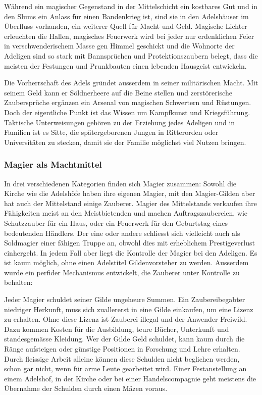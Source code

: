 \documentclass[12pt,twoside,twocolumn,openany]{book}
\begin{document}
Während ein magischer Gegenstand in der Mittelschicht ein kostbares Gut und in den Slums ein Anlass für einen Bandenkrieg ist, sind sie in den Adelshäuser im Überfluss vorhanden, ein weiterer Quell für Macht und Geld.
Magische Lichter erleuchten die Hallen, magisches Feuerwerk wird bei jeder nur erdenklichen Feier in verschwenderischem Masse gen Himmel geschickt und die Wohnorte der Adeligen sind so stark mit Bannsprüchen und Protektionszaubern belegt, dass die meisten der Festungen und Prunkbauten einen lebenden Hausgeist entwickeln.

Die Vorherrschaft des Adels gründet ausserdem in seiner militärischen Macht. Mit seinem Geld kann er Söldnerheere auf die Beine stellen und zerstörerische Zaubersprüche ergänzen ein Arsenal von magischen Schwertern und Rüstungen. Doch der eigentliche Punkt ist das Wissen um Kampfkunst und Kriegsführung. Taktische Unterweisungen gehören zu der Erziehung jedes Adeligen und in Familien ist es Sitte, die spätergeborenen Jungen in Ritterorden oder Universitäten zu stecken, damit sie der Familie möglichst viel Nutzen bringen.

\subsubsection{Magier als Machtmittel}
In drei verschiedenen Kategorien finden sich Magier zusammen: Sowohl die Kirche wie die Adelshöfe haben ihre eigenen Magier, mit den Magier-Gilden aber hat auch der Mittelstand einige Zauberer. Magier des Mittelstands verkaufen ihre Fähigkeiten meist an den Meistbietenden und machen Auftragszaubereien, wie Schutzzauber für ein Haus, oder ein Feuerwerk für den Geburtstag eines bedeutenden Händlers. Der eine oder andere schliesst sich vielleicht auch als Soldmagier einer fähigen Truppe an, obwohl dies mit erheblichem Prestigeverlust einhergeht. In jedem Fall aber liegt die Kontrolle der Magier bei den Adeligen. Es ist kaum möglich, ohne einen Adelstitel Gildenvorsteher zu werden. Ausserdem wurde ein perfider Mechanismus entwickelt, die Zauberer unter Kontrolle zu behalten:

Jeder Magier schuldet seiner Gilde ungeheure Summen. Ein Zaubereibegabter niedriger Herkunft, muss sich zuallererst in eine Gilde einkaufen, um eine Lizenz zu erhalten. Ohne diese Lizenz ist Zauberei illegal und der Anwender Freiwild. Dazu kommen Kosten für die Ausbildung, teure Bücher, Unterkunft und standesgemässe Kleidung. Wer der Gilde Geld schuldet, kann kaum durch die Ränge aufsteigen oder günstige Positionen in Forschung und Lehre erhalten. Durch fleissige Arbeit alleine können diese Schulden nicht beglichen werden, schon gar nicht, wenn für arme Leute gearbeitet wird. Einer Festanstellung an einem Adelshof, in der Kirche oder bei einer Handelscompagnie geht meistens die Übernahme der Schulden durch einen Mäzen voraus.
\end{document}
